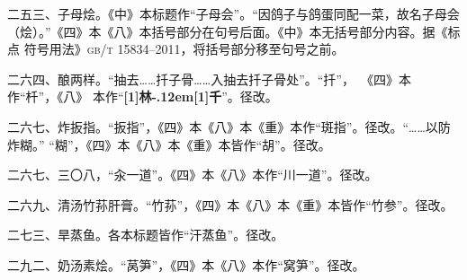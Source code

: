 \begin{list}{}
二五三、子母烩。《中》本标题作“子母会”。“因鸽子与鸽蛋同配一菜，故名子母会
（烩）。”《四》本《八》本括号部分在句号后面。《中》本无括号部分内容。据《标点
符号用法》\textsc{gb/t 15834--2011}，将括号部分移至句号之前。

二六四、酿两样。“抽去……扦子骨……入抽去扦子骨处”。“扦”，~《四》本作“杄”，《八》
本作“{\bfseries\scalebox{.65}[1]{林}\kern-.12em\scalebox{.55}[1]{千}}”。径改。

二六七、炸扳指。“扳指”，《四》本《八》本《重》本作“斑指”。径改。“……以防炸糊。”
“糊”，《四》本《八》本《重》本皆作“胡”。径改。

二六七、三〇八，“汆一道”。《四》本《八》本作“川一道”。径改。

二六九、清汤竹荪肝膏。“竹荪”，《四》本《八》本《重》本皆作“竹参”。径改。

二七三、旱蒸鱼。各本标题皆作“汗蒸鱼”。径改。

二九二、奶汤素烩。“莴笋”，《四》本《八》本作“窝笋”。径改。

\end{list}
\endgroup%

